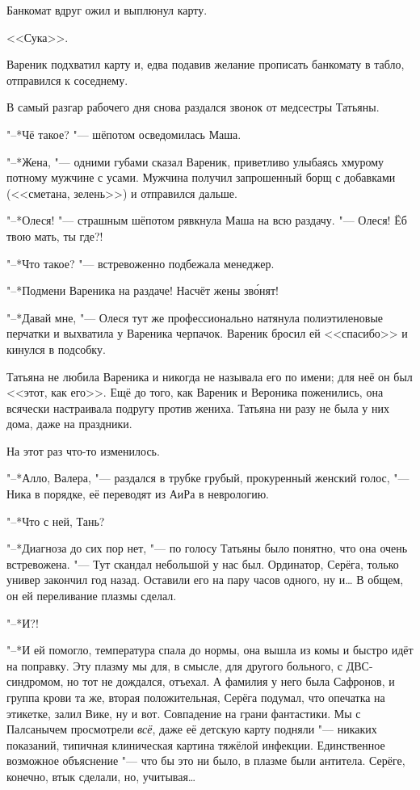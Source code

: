 Банкомат вдруг ожил и выплюнул карту.

<<Сука>>.

Вареник подхватил карту и, едва подавив желание прописать банкомату в табло, отправился к соседнему.

\asterism

\textspace

\label{Thu_2012_06_14}

В самый разгар рабочего дня снова раздался звонок от медсестры Татьяны.

"--*Чё такое? "--- шёпотом осведомилась Маша.

"--*Жена, "--- одними губами сказал Вареник, приветливо улыбаясь хмурому потному мужчине с усами.
Мужчина получил запрошенный борщ с добавками (<<сметана, зелень>>) и отправился дальше.

"--*Олеся! "--- страшным шёпотом рявкнула Маша на всю раздачу.
"--- Олеся!
Ёб твою мать, ты где?!

"--*Что такое? "--- встревоженно подбежала менеджер.

"--*Подмени Вареника на раздаче!
Насчёт жены зв\'онят!

"--*Давай мне, "--- Олеся тут же профессионально натянула полиэтиленовые перчатки и выхватила у Вареника черпачок.
Вареник бросил ей <<спасибо>> и кинулся в подсобку.

Татьяна не любила Вареника и никогда не называла его по имени;
для неё он был <<этот, как его>>.
Ещё до того, как Вареник и Вероника поженились, она всячески настраивала подругу против жениха.
Татьяна ни разу не была у них дома, даже на праздники.

На этот раз что-то изменилось.

"--*Алло, Валера, "--- раздался в трубке грубый, прокуренный женский голос, "--- Ника в порядке, её переводят из АиРа в неврологию.

"--*Что с ней, Тань?

"--*Диагноза до сих пор нет, "--- по голосу Татьяны было понятно, что она очень встревожена.
"--- Тут скандал небольшой у нас был.
Ординатор, Серёга, только универ закончил год назад.
Оставили его на пару часов одного, ну и\ldots{}
В общем, он ей переливание плазмы сделал.

"--*И?!

"--*И ей помогло, температура спала до нормы, она вышла из комы и быстро идёт на поправку.
Эту плазму мы для, в смысле, для другого больного, с ДВС-синдромом, но тот не дождался, отъехал.
А фамилия у него была Сафронов, и группа крови та же, вторая положительная, Серёга подумал, что опечатка на этикетке, залил Вике, ну и вот.
Совпадение на грани фантастики.
Мы с Палсанычем просмотрели \emph{всё}, даже её детскую карту подняли "--- никаких показаний, типичная клиническая картина тяжёлой инфекции.
Единственное возможное объяснение "--- что бы это ни было, в плазме были антитела.
Серёге, конечно, втык сделали, но, учитывая\ldots{}

